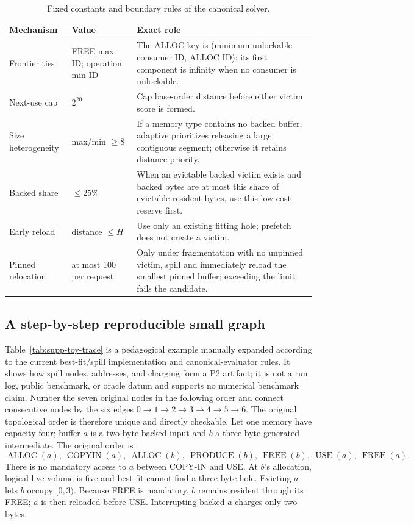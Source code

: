 \begin{table}[H]
\centering
\caption{Fixed constants and boundary rules of the canonical solver.}
\label{tab:supp-implementation-constants}
\begin{tabular}{@{}p{.22\linewidth}p{.15\linewidth}p{.55\linewidth}@{}}
\toprule
Mechanism & Value & Exact role\\
\midrule
Frontier ties & FREE max ID; operation min ID & The ALLOC key is (minimum unlockable consumer ID, ALLOC ID); its first component is infinity when no consumer is unlockable.\\
Next-use cap & $2^{20}$ & Cap base-order distance before either victim score is formed.\\
Size heterogeneity & max/min $\ge8$ & If a memory type contains no backed buffer, adaptive prioritizes releasing a large contiguous segment; otherwise it retains distance priority.\\
Backed share & $\le25\%$ & When an evictable backed victim exists and backed bytes are at most this share of evictable resident bytes, use this low-cost reserve first.\\
Early reload & distance $\le H$ & Use only an existing fitting hole; prefetch does not create a victim.\\
Pinned relocation & at most 100 per request & Only under fragmentation with no unpinned victim, spill and immediately reload the smallest pinned buffer; exceeding the limit fails the candidate.\\
\bottomrule
\end{tabular}
\end{table}

\subsection{A step-by-step reproducible small graph}

Table~\ref{tab:supp-toy-trace} is a pedagogical example manually expanded according to the current best-fit/spill implementation and canonical-evaluator rules. It shows how spill nodes, addresses, and charging form a P2 artifact; it is not a run log, public benchmark, or oracle datum and supports no numerical benchmark claim. Number the seven original nodes in the following order and connect consecutive nodes by the six edges $0\to1\to2\to3\to4\to5\to6$. The original topological order is therefore unique and directly checkable. Let one memory have capacity four; buffer $a$ is a two-byte backed input and $b$ a three-byte generated intermediate. The original order is
\[
 \operatorname{ALLOC}(a),\ \operatorname{COPYIN}(a),\
 \operatorname{ALLOC}(b),\ \operatorname{PRODUCE}(b),\
 \operatorname{FREE}(b),\ \operatorname{USE}(a),\ \operatorname{FREE}(a).
\]
There is no mandatory access to $a$ between COPY-IN and USE. At $b$'s allocation, logical live volume is five and best-fit cannot find a three-byte hole. Evicting $a$ lets $b$ occupy $[0,3)$. Because FREE is mandatory, $b$ remains resident through its FREE; $a$ is then reloaded before USE. Interrupting backed $a$ charges only two bytes.

